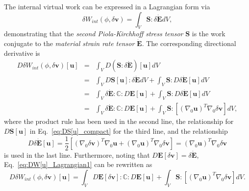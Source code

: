 The internal virtual work can be expressed in a Lagrangian form via
%
\begin{equation}
\delta W_{int}(\phi,\delta \pmb{v}) = \int_V \pmb{S} : \delta \dot{\pmb{E}}dV,
\end{equation}
%
demonstrating that the \textit{second Piola-Kirchhoff stress tensor} $\pmb{S}$ is the work conjugate to the \textit{material strain rate tensor} $\dot{\pmb{E}}$. The corresponding directional derivative is
%
\begin{eqnarray}
D\delta W_{int}(\phi,\delta \pmb{v})[\pmb{u}] &=& \int_V D(\pmb{S}:\delta \dot{\pmb{E}})[\pmb{u}]dV \nonumber\\
%
&=& \int_V D\pmb{S}[\pmb{u}]:\delta \dot{\pmb{E}}dV +  \int_V \pmb{S}: D\delta \dot{\pmb{E}}[\pmb{u}]dV \nonumber\\
%
&=& \int_V \delta \dot{\pmb{E}}:\pmb{\mathbb{C}}:D\pmb{E}[\pmb{u}] +  \int_V \pmb{S}: D\delta \dot{\pmb{E}}[\pmb{u}]dV \nonumber\\
%
&=& \int_V \delta \dot{\pmb{E}}:\pmb{\mathbb{C}}:D\pmb{E}[\pmb{u}] +  \int_V \pmb{S}: [(\nabla_0 \pmb{u})^T \nabla_0\delta \pmb{v}]dV,
\label{eq:DW[u]_Lagrangian1}
\end{eqnarray}
%
where the product rule has been used in the second line, the relationship for $D\pmb{S}[\pmb{u}]$ in Eq.\ \eqref{eq:DS[u]_compact} for the third line, and the relationship
%
\begin{equation}
D\delta \dot{\pmb{E}}[\pmb{u}] = \frac{1}{2}[(\nabla_0 \delta \pmb{v})^T\nabla_0 \pmb{u} + (\nabla_0 \pmb{u})^T\nabla_0\delta \pmb{v}]
%
= (\nabla_0 \pmb{u})^T \nabla_0\delta \pmb{v}
\end{equation}
%
is used in the last line. Furthermore, noting that $D\pmb{E}[\delta \pmb{v}] = \delta \dot{\pmb{E}}$, Eq.\ \eqref{eq:DW[u]_Lagrangian1} can be rewritten as
%
\begin{equation}
D\delta W_{int}(\phi,\delta \pmb{v})[\pmb{u}] = \int_V D\pmb{E}[\delta\pmb{v}] :\pmb{\mathbb{C}}:D\pmb{E}[\pmb{u}] +  \int_V \pmb{S}: [(\nabla_0 \pmb{u})^T \nabla_0\delta \pmb{v}]dV.
\label{eq:DW[u]_Lagrangian}
\end{equation}
%

